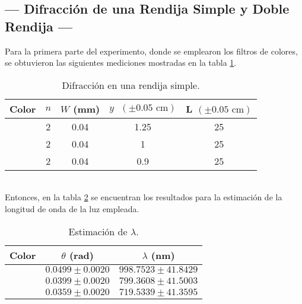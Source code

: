 \documentclass[12pt,a4paper]{article}
\begin{document}
\subsection{--- Difracción de una Rendija Simple y Doble Rendija ---} %
\label{sub:resul_difraccion_simple}
Para la primera parte del experimento, donde se emplearon los filtros de colores, se obtuvieron las siguientes mediciones mostradas en la tabla \ref{tab:1}.
\begin{table}[!htb]
\centering
\caption{Difracción en una rendija simple.}
\begin{tabular}{|c|c|c|c|c|}
	\hline
	Color & $ n $ & $ W $ (mm) & $ y\mbox{ }(\pm0.05\mbox{ cm})$  & L $(\pm0.05\mbox{ cm})$ \\	\hline
	\rowcolor{red!25}
	\cellcolor{red!40}{Rojo} & 2 & 0.04 & 1.25 & 25 \\	\hline
	\rowcolor{green!25}
	\cellcolor{green!40}{Verde} & 2 & 0.04 & 1 & 25 \\	\hline
	\rowcolor{blue!25}
	\cellcolor{blue!40}{Azul} & 2 & 0.04 & 0.9 & 25 \\	\hline
\end{tabular}
\label{tab:1}
\end{table}\\
Entonces, en la tabla \ref{tab:2} se encuentran los resultados para la estimación de la longitud de onda de la luz empleada.
\begin{table}[!htb]
\centering
\caption{Estimación de $ \lambda $.}
\begin{tabular}{|c|c|c|}
	\hline
	Color & $ \theta $ (rad) & $ \lambda $ (nm)\\	\hline
	\rowcolor{red!25}
	\cellcolor{red!40}{Rojo} & $ 0.0499\pm 0.0020 $ & $ 998.7523\pm 41.8429 $ \\	\hline
	\rowcolor{green!25}
	\cellcolor{green!40}{Verde} & $ 0.0399\pm 0.0020 $ & $ 799.3608\pm 41.5003 $ \\	\hline
	\rowcolor{blue!25}
	\cellcolor{blue!40}{Azul} & $ 0.0359\pm 0.0020 $ & $ 719.5339\pm 41.3595 $ \\	\hline
\end{tabular}
\label{tab:2}
\end{table}
\end{document}
